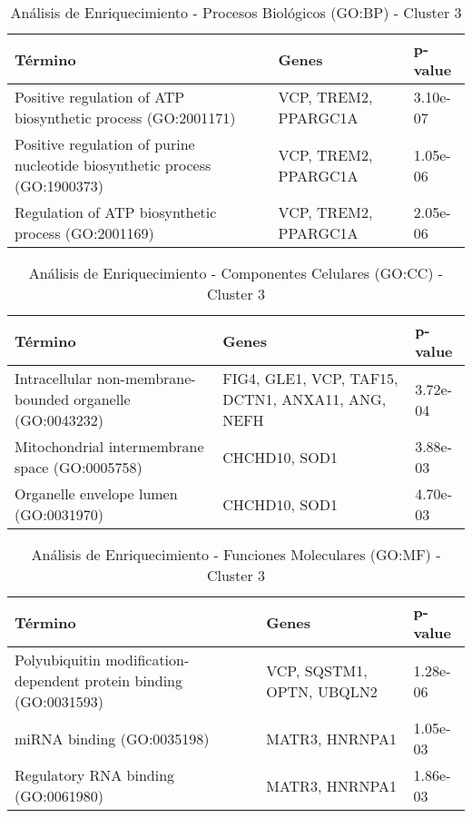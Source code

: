 \begin{table}[H]
	\centering
	\caption{Análisis de Enriquecimiento - Procesos Biológicos (GO:BP) - Cluster 3}
	\label{tb:c2_t1}
	\begin{tabular}{|p{4cm}|p{4cm}|p{3cm}|}
		\hline
		\textbf{Término} & \textbf{Genes} & \textbf{p-value} \\ \hline
		Positive regulation of ATP biosynthetic process (GO:2001171) & VCP, TREM2, PPARGC1A & 3.10e-07 \\ \hline
		Positive regulation of purine nucleotide biosynthetic process (GO:1900373) & VCP, TREM2, PPARGC1A & 1.05e-06 \\ \hline
		Regulation of ATP biosynthetic process (GO:2001169) & VCP, TREM2, PPARGC1A & 2.05e-06 \\ \hline
	\end{tabular}
\end{table}

\begin{table}[H]
	\centering
	\caption{Análisis de Enriquecimiento - Componentes Celulares (GO:CC) - Cluster 3}
	\label{tb:c2_t2}
	\begin{tabular}{|p{4cm}|p{4cm}|p{3cm}|}
		\hline
		\textbf{Término} & \textbf{Genes} & \textbf{p-value} \\ \hline
		Intracellular non-membrane-bounded organelle (GO:0043232) & FIG4, GLE1, VCP, TAF15, DCTN1, ANXA11, ANG, NEFH & 3.72e-04 \\ \hline
		Mitochondrial intermembrane space (GO:0005758) & CHCHD10, SOD1 & 3.88e-03 \\ \hline
		Organelle envelope lumen (GO:0031970) & CHCHD10, SOD1 & 4.70e-03 \\ \hline
	\end{tabular}
\end{table}


\begin{table}[H]
	\centering
	\caption{Análisis de Enriquecimiento - Funciones Moleculares (GO:MF) - Cluster 3}
	\label{tb:c2_t3}
	\begin{tabular}{|p{4cm}|p{4cm}|p{3cm}|}
		\hline
		\textbf{Término} & \textbf{Genes} & \textbf{p-value} \\ \hline
		Polyubiquitin modification-dependent protein binding (GO:0031593) & VCP, SQSTM1, OPTN, UBQLN2 & 1.28e-06 \\ \hline
		miRNA binding (GO:0035198) & MATR3, HNRNPA1 & 1.05e-03 \\ \hline
		Regulatory RNA binding (GO:0061980) & MATR3, HNRNPA1 & 1.86e-03 \\ \hline
	\end{tabular}
\end{table}


